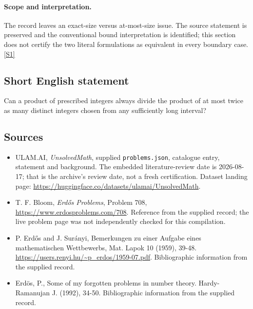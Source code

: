 \documentclass[11pt,a4paper]{article}
\newcommand{\sref}[2]{\hyperlink{source:#1:#2}{[S#2]}}
\begin{document}
\paragraph{Scope and interpretation.}

The record leaves an exact-size versus at-most-size issue. The source statement is preserved and the conventional bound interpretation is identified; this section does not certify the two literal formulations as equivalent in every boundary case. \sref{statement}{1}

\subsection{Short English statement}

Can a product of prescribed integers always divide the product of at most twice as many distinct integers chosen from any sufficiently long interval?

\subsection{Sources}

{\small

\begin{itemize}

\item[\hypertarget{source:statement:1}{S1}] ULAM.AI, \emph{UnsolvedMath}, supplied \texttt{problems.json}, catalogue entry, statement and background. The embedded literature-review date is 2026-08-17; that is the archive’s review date, not a fresh certification. Dataset landing page: \url{https://huggingface.co/datasets/ulamai/UnsolvedMath}.

\item[\hypertarget{source:statement:2}{S2}] T. F. Bloom, \emph{Erdős Problems}, Problem 708, \url{https://www.erdosproblems.com/708}. Reference from the supplied record; the live problem page was not independently checked for this compilation.

\item[\hypertarget{source:statement:3}{S3}] P. Erdős and J. Surányi, Bemerkungen zu einer Aufgabe eines mathematischen Wettbewerbs, Mat. Lapok 10 (1959), 39-48. \url{https://users.renyi.hu/~p_erdos/1959-07.pdf}. Bibliographic information from the supplied record.

\item[\hypertarget{source:statement:4}{S4}] Erd\"{o}s, P., Some of my forgotten problems in number theory. Hardy-Ramanujan J. (1992), 34-50. Bibliographic information from the supplied record.

\end{itemize}

}

\label{end:statement}
\end{document}
